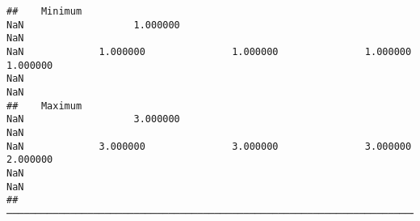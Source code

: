 \documentclass[
]{article}
\begin{document}
\begin{verbatim}
##    Minimum                                                                  NaN                   1.000000                                                                  NaN                                                                  NaN             1.000000               1.000000               1.000000               1.000000                                                                  NaN                                                                  NaN   
##    Maximum                                                                  NaN                   3.000000                                                                  NaN                                                                  NaN             3.000000               3.000000               3.000000               2.000000                                                                  NaN                                                                  NaN   
##  ─────────────────────────────────────────────────────────────────────────────────────────────────────────────────────────────────────────────────────────────────────────────────────────────────────────────────────────────────────────────────────────────────────────────────────────────────────────────────────────────────────────────────────────────────────────────────────────────────────────────────────────────────────────────────────────────────────────────────────────
\end{verbatim}
\end{document}
